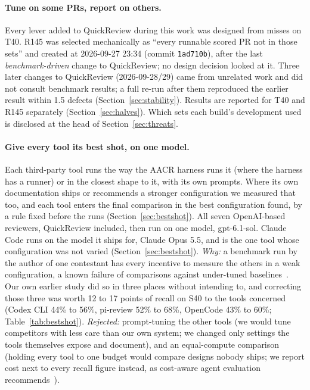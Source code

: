 \documentclass[11pt,a4paper]{article}
\newcommand{\qcr}{QuickReview}
\newcommand{\code}[1]{\texttt{#1}}
\begin{document}
\paragraph{Tune on some PRs, report on others.} Every lever added to \qcr{}
during this work was designed from misses on T40. R145 was selected
mechanically as ``every runnable scored PR not in those sets'' and created
at 2026-09-27 23:34 (commit \code{1ad710b}), after the last
\emph{benchmark-driven} change to \qcr{}; no design decision looked at it.
Three later changes to \qcr{} (2026-09-28/29) came from
unrelated work and did not consult benchmark results; a full re-run after
them reproduced the earlier result within 1.5 defects
(Section~\ref{sec:stability}). Results are reported for T40 and R145
separately (Section~\ref{sec:halves}). Which sets each build's development
used is disclosed at the head of Section~\ref{sec:threats}.

\paragraph{Give every tool its best shot, on one model.} Each third-party
tool runs the way the AACR harness runs it (where the harness has a runner)
or in the closest shape to it, with its own prompts. Where its own
documentation ships or recommends a stronger configuration we measured that
too, and each tool enters the final comparison in the best configuration
found, by a rule fixed before the runs (Section~\ref{sec:bestshot}). All
seven OpenAI-based reviewers, \qcr{} included, then run on one model,
gpt-6.1-sol. Claude Code runs on the model it ships for, Claude Opus 5.5,
and is the one tool whose configuration was not varied
(Section~\ref{sec:bestshot}). \emph{Why:} a benchmark run by the author of
one contestant has every incentive to measure the others in a weak
configuration, a known failure of comparisons against under-tuned
baselines~\cite{melis2018,lucic2018}. Our own earlier study did so in three
places without intending to, and correcting those three was worth 12 to 17
points of recall on S40 to the tools concerned (Codex CLI 44\% to 56\%,
pi-review 52\% to 68\%, OpenCode 43\% to 60\%; Table~\ref{tab:bestshot}). \emph{Rejected:} prompt-tuning the
other tools (we would tune competitors with less care than our own system;
we changed only settings the tools themselves expose and document), and an
equal-compute comparison (holding every tool to one budget would compare
designs nobody ships; we report cost next to every recall figure instead,
as cost-aware agent evaluation recommends~\cite{kapoor2024agents}).
\end{document}
